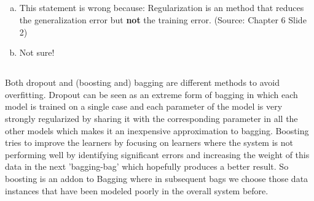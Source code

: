 \documentclass[12pt]{article}
\begin{document}

\setcounter{section}{6}
\setcounter{subsection}{1}

\subsection{ }

\begin{enumerate}[a)]
    \item   
        This statement is wrong because: Regularization is an method that reduces the generalization error but \textbf{not} the training error. (Source: Chapter 6 Slide 2)
    \item
        Not sure!
\end{enumerate}

\subsection{}
Both dropout and (boosting and) bagging are different methods to avoid overfitting.
Dropout can be seen as an extreme form of bagging in which each model is trained on a single case and each parameter of the model is very strongly regularized by sharing it with the corresponding parameter in all the other models which makes it an inexpensive approximation to bagging.
Boosting tries to improve the learners by focusing on learners where the system is not performing well by identifying significant errors and increasing the weight of this data in the next 'bagging-bag' which hopefully produces a better result. So boosting is an addon to Bagging where in subsequent bags we choose those data instances that have been modeled poorly in the overall system before.

\subsection{}
\end{document}
